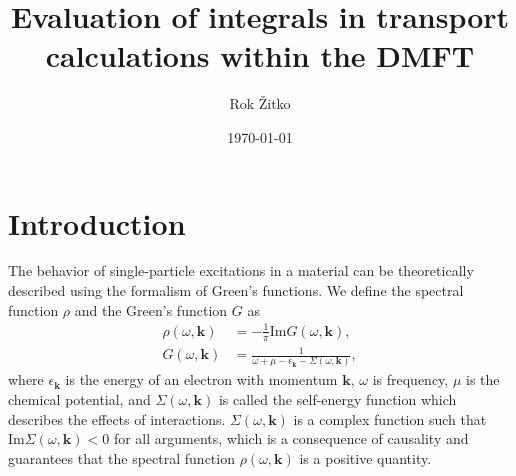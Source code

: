 \documentclass[prb,amsmath,amssymb,onecolumn,nopacs,floatfix,longbibliography]{revtex4-1}
\begin{document}
\title{Evaluation of integrals in transport calculations within the DMFT}

\author{Rok \v{Z}itko}

\date{\today}

\begin{abstract}
\end{abstract}



\maketitle

\newcommand{\vc}[1]{{\mathbf{#1}}}
\newcommand{\vck}{\vc{k}}
\newcommand{\braket}[2]{\langle#1|#2\rangle}
\newcommand{\expv}[1]{\langle #1 \rangle}
\newcommand{\corr}[1]{\langle\langle #1 \rangle\rangle}
\newcommand{\ket}[1]{| #1 \rangle}
\newcommand{\Tr}{\mathrm{Tr}}
\newcommand{\kor}[1]{\langle\langle #1 \rangle\rangle}
\newcommand{\degg}{^\circ}
\renewcommand{\Im}{\mathrm{Im}}
\renewcommand{\Re}{\mathrm{Re}}
\newcommand{\dtN}{{\dot N}}
\newcommand{\dtQ}{{\dot Q}}
\newcommand{\sgn}{\mathrm{sgn}}
\newcommand{\beq}[1]{\begin{equation} #1 \end{equation}}
\newcommand{\one}{\mathbf{1}}


\section{Introduction}

The behavior of single-particle excitations in a material can be
theoretically described using the formalism of Green's functions. We
define the spectral function $\rho$ and the Green's function $G$ as
\beq{
\begin{split}
\rho(\omega,\vc{k}) &= -\frac{1}{\pi} \Im G(\omega,\vc{k}), \\
G(\omega,\vc{k}) &= \frac{1}{\omega+\mu-\epsilon_\vc{k}-\Sigma(\omega,\vc{k})},
\end{split}
}
%
where $\epsilon_\vc{k}$ is the energy of an electron with momentum
$\vc{k}$, $\omega$ is frequency, $\mu$ is the chemical potential, and
$\Sigma(\omega,\vc{k})$ is called the self-energy function which
describes the effects of interactions.
$\Sigma(\omega,\vc{k})$ is a complex function such that
$\Im\Sigma(\omega,\vc{k})<0$ for all arguments, which is a consequence
of causality and guarantees that the spectral function
$\rho(\omega,\vc{k})$ is a positive quantity. 
\end{document}
